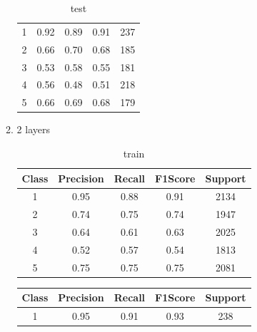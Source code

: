 \begin{enumerate}[label=(\alph*)]
\begin{enumerate}[label=\roman*.]
\begin{table}[!htb]
\begin{tabular}{ccccc}
                            1     & 0.92      & 0.89   & 0.91    & 237     \\
                            2     & 0.66      & 0.70   & 0.68    & 185     \\
                            3     & 0.53      & 0.58   & 0.55    & 181     \\
                            4     & 0.56      & 0.48   & 0.51    & 218     \\
                            5     & 0.66      & 0.69   & 0.68    & 179     \\ \hline
                        \end{tabular}
                        \caption{test}
                        \label{part e test depth 1}
                    \end{table}
                    \newpage
              \item 2 layers
                    \begin{table}[!htb]
                        \centering
                        \begin{tabular}{ccccc}
                            \hline
                            Class & Precision & Recall & F1Score & Support \\ \hline
                            1     & 0.95      & 0.88   & 0.91    & 2134    \\
                            2     & 0.74      & 0.75   & 0.74    & 1947    \\
                            3     & 0.64      & 0.61   & 0.63    & 2025    \\
                            4     & 0.52      & 0.57   & 0.54    & 1813    \\
                            5     & 0.75      & 0.75   & 0.75    & 2081    \\ \hline
                        \end{tabular}
                        \caption{train}
                        \label{part e train depth 2}
                    \end{table}
                    \begin{table}[!htb]
                        \centering
                        \begin{tabular}{ccccc}
                            \hline
                            Class & Precision & Recall & F1Score & Support \\ \hline
                            1     & 0.95      & 0.91   & 0.93    & 238     \\

\end{tabular}
\end{table}
\end{enumerate}
\end{enumerate}
